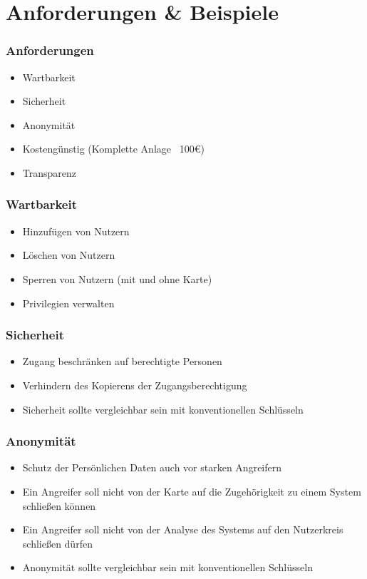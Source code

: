\section{Anforderungen \& Beispiele}
\begin{frame}
	\frametitle{Anforderungen}
	\begin{itemize}
		\item<2-> Wartbarkeit
		\item<3-> Sicherheit
		\item<4-> Anonymität
		\item<5-> Kostengünstig (Komplette Anlage ~100\euro{})
		\item<6-> Transparenz
	\end{itemize}
\end{frame}

\begin{frame}
	\frametitle{Wartbarkeit}
	\begin{itemize}
		\item<2-> Hinzufügen von Nutzern
		\item<3-> Löschen von Nutzern
		\item<4-> Sperren von Nutzern (mit und ohne Karte)
		\item<4-> Privilegien verwalten
	\end{itemize}
\end{frame}
\begin{frame}
	\frametitle{Sicherheit}
	\begin{itemize}
		\item<2-> Zugang beschränken auf berechtigte Personen
		\item<3-> Verhindern des Kopierens der Zugangsberechtigung
		\item<4-> Sicherheit sollte vergleichbar sein mit konventionellen Schlüsseln
	\end{itemize}
\end{frame}

\begin{frame}
	\frametitle{Anonymität}
	\begin{itemize}
		\item<2-> Schutz der Persönlichen Daten auch vor starken Angreifern
		\item<3-> Ein Angreifer soll nicht von der Karte auf die Zugehörigkeit zu einem System schließen können
		\item<4-> Ein Angreifer soll nicht von der Analyse des Systems auf den Nutzerkreis schließen dürfen
		\item<5-> Anonymität sollte vergleichbar sein mit konventionellen Schlüsseln
	\end{itemize}
\end{frame}

